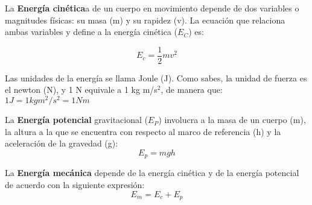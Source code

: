 \begin{tcolorbox}[colback=colorrds!5!white,
        colframe=colorrds!35!white,
        coltitle=black,
        fonttitle=\bfseries,
        center title,
        title=Energía]

    La   \textbf{Energía cinética}a de un cuerpo en movimiento depende de
    dos variables o magnitudes f\'isicas: su masa (m) y su rapidez (v). La ecuaci\'on
    que relaciona ambas variables y define a la energ\'ia cin\'etica ($E_C$) es:

    \[E_c=\frac{1}{2}mv^2 \]

    Las unidades de la energía se llama Joule (J). Como sabes, la unidad de fuerza es el
    newton (N), y 1 N equivale a 1 kg m/s$^2$, de manera que: $1 J = 1 kg m^2/s^2 = 1 Nm $
    \tcblower

    La \textbf{Energía potencial} gravitacional ($E_P$) involucra
    a la masa de un cuerpo (m), la altura a la que se encuentra con respecto al
    marco de referencia (h) y la aceleraci\'on de la gravedad (g):
    \[E_p=mgh\]
    \DrawLine

    La \textbf{Energía mecánica} depende de la energ\'ia
    cin\'etica y de la energ\'ia potencial de acuerdo con la siguiente expresi\'on:
    \begin{equation*}
        E_m=E_c+E_p
    \end{equation*}
\end{tcolorbox}